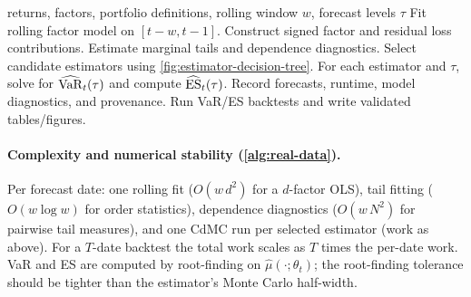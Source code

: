 \begin{algorithm}[H]
\caption{Real-data rolling VaR/ES protocol}
\label{alg:real-data}
\begin{algorithmic}[1]
\Require returns, factors, portfolio definitions, rolling window \(w\), forecast levels \(\tau\)
  \State Fit rolling factor model on \([t-w,t-1]\).
  \State Construct signed factor and residual loss contributions.
  \State Estimate marginal tails and dependence diagnostics.
  \State Select candidate estimators using \cref{fig:estimator-decision-tree}.
  \State For each estimator and \(\tau\), solve for \(\widehat{\mathrm{VaR}}_t(\tau)\) and compute \(\widehat{\mathrm{ES}}_t(\tau)\).
  \State Record forecasts, runtime, model diagnostics, and provenance.
\EndFor
\State Run VaR/ES backtests and write validated tables/figures.
\end{algorithmic}
\end{algorithm}

\paragraph{Complexity and numerical stability (\cref{alg:real-data}).}
Per forecast date: one rolling fit ($O(w\,d^2)$ for a $d$-factor OLS), tail
fitting ($O(w\log w)$ for order statistics), dependence diagnostics
($O(w\,N^2)$ for pairwise tail measures), and one CdMC run per selected
estimator (work as above). For a $T$-date backtest the total work scales as
$T$ times the per-date work. VaR and ES are computed by root-finding on
$\widehat\mu(\cdot;\theta_t)$; the root-finding tolerance should be tighter
than the estimator's Monte Carlo half-width.
